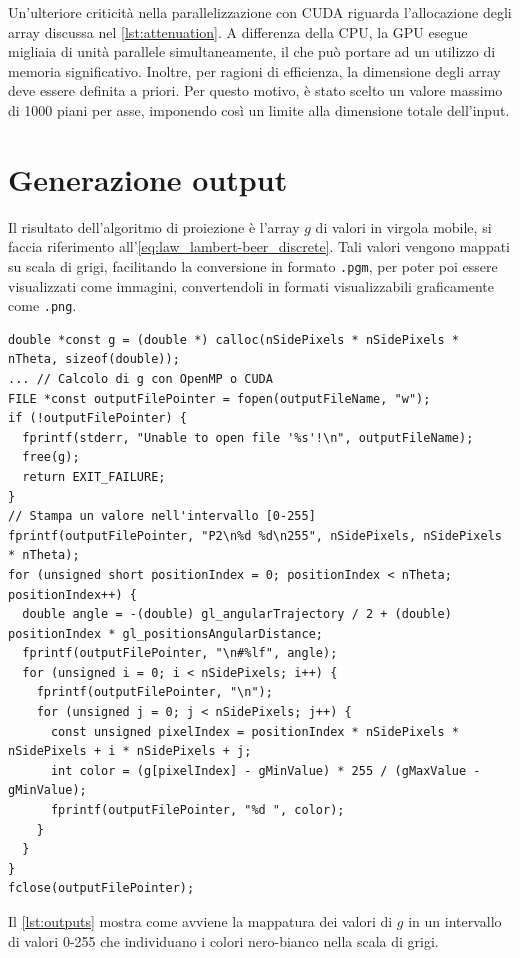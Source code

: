 \documentclass[12pt,a4paper]{report}
\begin{document}
Un'ulteriore criticità nella parallelizzazione con CUDA riguarda l'allocazione degli array discussa nel \autoref{lst:attenuation}.
A differenza della CPU, la GPU esegue migliaia di unità parallele simultaneamente, il che può portare ad un utilizzo di memoria
significativo.
Inoltre, per ragioni di efficienza, la dimensione degli array deve essere definita a priori.
Per questo motivo, è stato scelto un valore massimo di 1000 piani per asse, imponendo così un limite alla dimensione totale
dell'input.

\section{Generazione output}

Il risultato dell'algoritmo di proiezione è l'array \(g\) di valori in virgola mobile, si faccia riferimento
all'\autoref{eq:law_lambert-beer_discrete}.
Tali valori vengono mappati su scala di grigi, facilitando la conversione in formato \lstinline{.pgm}, per poter poi essere
visualizzati come immagini, convertendoli in formati visualizzabili graficamente come \lstinline{.png}.

\begin{lstlisting}[language=CStyle, caption={Codice C per la mappatura dell'output in immagini.}, label={lst:outputs}]
double *const g = (double *) calloc(nSidePixels * nSidePixels * nTheta, sizeof(double));
... // Calcolo di g con OpenMP o CUDA
FILE *const outputFilePointer = fopen(outputFileName, "w");
if (!outputFilePointer) {
  fprintf(stderr, "Unable to open file '%s'!\n", outputFileName);
  free(g);
  return EXIT_FAILURE;
}
// Stampa un valore nell'intervallo [0-255]
fprintf(outputFilePointer, "P2\n%d %d\n255", nSidePixels, nSidePixels * nTheta);
for (unsigned short positionIndex = 0; positionIndex < nTheta; positionIndex++) {
  double angle = -(double) gl_angularTrajectory / 2 + (double) positionIndex * gl_positionsAngularDistance;
  fprintf(outputFilePointer, "\n#%lf", angle);
  for (unsigned i = 0; i < nSidePixels; i++) {
    fprintf(outputFilePointer, "\n");
    for (unsigned j = 0; j < nSidePixels; j++) {
      const unsigned pixelIndex = positionIndex * nSidePixels * nSidePixels + i * nSidePixels + j;
      int color = (g[pixelIndex] - gMinValue) * 255 / (gMaxValue - gMinValue);
      fprintf(outputFilePointer, "%d ", color);
    }
  }
}
fclose(outputFilePointer);
\end{lstlisting}

Il \autoref{lst:outputs} mostra come avviene la mappatura dei valori di \(g\) in un intervallo di valori 0-255 che individuano i
colori nero-bianco nella scala di grigi.
\end{document}
